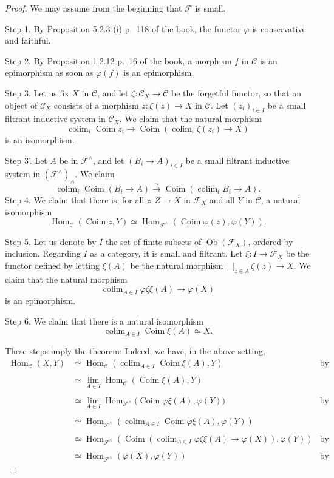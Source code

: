 \documentclass[12pt]{article}
\theoremstyle{remark}
\theoremstyle{definition}
\newcommand{\nn}{\noindent}
\newcommand{\C}{\mathcal C}
\newcommand{\F}{\mathcal F}
\newcommand{\pp}{\varphi}
\DeclareMathOperator*{\colim}{colim}
\DeclareMathOperator{\Coim}{Coim}
\DeclareMathOperator{\Hom}{Hom}
\DeclareMathOperator{\Ob}{Ob}
\begin{document}
\begin{proof} We may assume from the beginning that $\F$ is small.

\nn Step 1. By Proposition 5.2.3 (i) p.~118 of the book, the functor $\pp$ is conservative and faithful.

\nn Step 2. By Proposition 1.2.12 p.~16 of the book, a morphism $f$ in $\C$ is an epimorphism as soon as $\pp(f)$ is an epimorphism.

\nn Step 3. Let us fix $X$ in $\C$, and let $\zeta:\C_X\to\C$ be the forgetful functor, so that an object of $\C_X$ consists of a morphism $z:\zeta(z)\to X$ in $\C$. Let $(z_i)_{i\in I}$ be a small filtrant inductive system in $\C_X$. We claim that the natural morphism
$$
\colim_i\Coim z_i\to\Coim\left(\colim_i\zeta(z_i)\to X\right)
$$
is an isomorphism.

\nn Step 3'. Let $A$ be in $\F^\wedge$, and let $(B_i\to A)_{i\in I}$ be a small filtrant inductive system in $(\F^\wedge)_A$. We claim 
$$
\colim_i\Coim(B_i\to A)\xrightarrow{\sim}
\Coim\left(\colim_iB_i\to A\right).
$$
Step 4. We claim that there is, for all $z:Z\to X$ in $\F_X$ and all $Y$ in $\C$, a natural isomorphism 
$$
\Hom_\C(\Coim z,Y)\simeq\Hom_{\F^\wedge}(\Coim\pp(z),\pp(Y)).
$$ 

\nn Step 5. Let us denote by $I$ the set of finite subsets of $\Ob(\F_X)$, ordered by inclusion. Regarding $I$ as a category, it is small and filtrant. Let $\xi:I\to\F_X$ be the functor defined by letting $\xi(A)$ be the natural morphism $\bigsqcup_{z\in A}\zeta(z)\to X$. We claim that the natural morphism 
$$
\colim_{A\in I}\pp\zeta\xi(A)\to\pp(X) 
$$ 
is an epimorphism.

\nn Step 6. We claim that there is a natural isomorphism 
$$
\colim_{A\in I}\Coim\xi(A)\simeq X. 
$$

These steps imply the theorem: Indeed, we have, in the above setting, 
%
\begin{align*} 
%
\Hom_\C(X,Y)&\simeq\Hom_\C\left(\colim_{A\in I}\Coim\xi(A),Y\right)&\text{by Step 6}\\ \\ 
%
&\simeq\lim_{A\in I}\Hom_\C(\Coim\xi(A),Y)\\ \\ 
%
&\simeq\lim_{A\in I}\Hom_{\F^\wedge}\Big(\Coim\pp\xi(A),\pp(Y)\Big)&\text{by Step 4}\\ \\ 
%
&\simeq\Hom_{\F^\wedge}\left(\colim_{A\in I}\Coim\pp\xi(A),\pp(Y)\right)\\ \\ 
%
&\simeq\Hom_{\F^\wedge}\left(\Coim\left(\colim_{A\in I}\pp\zeta\xi(A)\to\pp(X)\right),\pp(Y)\right)&\text{by Step 3'}\\ \\ 
%
&\simeq\Hom_{\F^\wedge}(\pp(X),\pp(Y))&\text{by Step 5.}
%
\end{align*} 


\end{proof}
\end{document}
